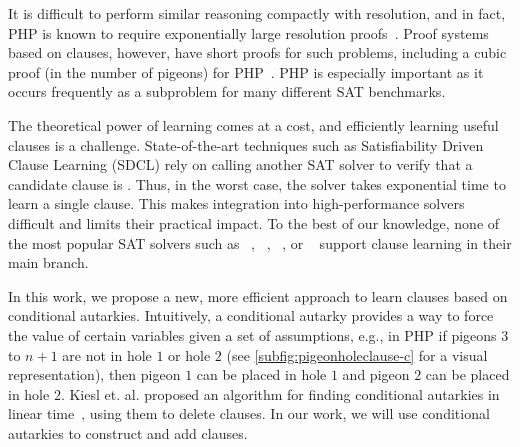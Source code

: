 It is difficult to perform similar reasoning compactly with resolution, and in
fact, PHP is known to require exponentially large resolution
proofs~\cite{hakenpigeonhole}. Proof systems
based on \pr clauses, however, have short proofs for such problems, including a
cubic proof (in the number of pigeons) for PHP~\cite{prclauses}. PHP is especially
important as it occurs frequently as a subproblem for many different SAT benchmarks.

The theoretical power of \pr learning comes at a cost, and efficiently learning
useful \pr clauses is a challenge. State-of-the-art techniques such as
Satisfiability Driven Clause Learning (SDCL) rely on calling another SAT solver
to verify that a candidate clause is \pr \cite{sadical}. 
Thus, in the worst case, the solver takes exponential time to learn a single \pr
clause. This makes integration into high-performance solvers difficult and
limits their practical impact. To the best of our knowledge, none of the most popular SAT solvers
such as \cadical~\cite{cadical}, \kissat~\cite{kissat},
\cryptoMiniSAT~\cite{cryptominisat}, or \lingeling~\cite{lingeling} support
\pr clause learning in their main branch.

In this work, we propose a new, more efficient approach to learn \pr clauses
based on conditional autarkies. Intuitively, a conditional autarky provides a
way to force the value of certain variables given a set of assumptions, e.g., in
PHP if pigeons $3 $ to $ n+1$ are not in hole $1$ or hole $2$ (see \autoref{subfig:pigeonholeclause-c}
for a visual representation), then pigeon $1$
can be placed in hole $1$ and pigeon $2$ can be placed in hole $2$. Kiesl et.
al. proposed an algorithm for finding conditional autarkies in linear
time~\cite{conditionalautarkies}, using them to delete clauses. In our work, we
will use conditional autarkies to construct and add \pr clauses. 
%

